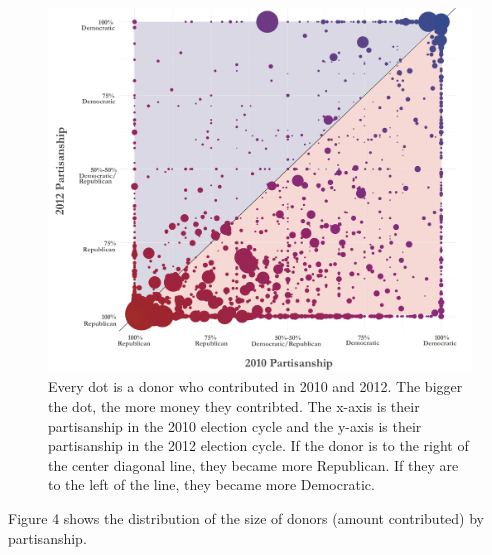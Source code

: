\documentclass[12pt,]{article}
\begin{document}
\begin{figure}
\includegraphics[width=1\linewidth]{../figures/fig3} \caption{Every dot is a donor who contributed in 2010 and 2012. The bigger the dot, the more money they contribted. The x-axis is their partisanship in the 2010 election cycle and the y-axis is their partisanship in the 2012 election cycle. If the donor is to the right of the center diagonal line, they became more Republican. If they are to the left of the line, they became more Democratic.}\label{fig:unnamed-chunk-14}
\end{figure}

Figure 4 shows the distribution of the size of donors (amount
contributed) by partisanship.
\end{document}
